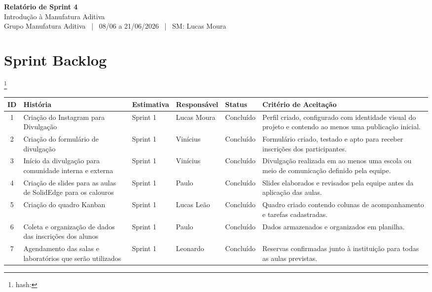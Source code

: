 \documentclass[12pt,a4paper]{article}
\newcommand{\projetotitulo}{Introdução à Manufatura Aditiva}
\newcommand{\grupoid}{Grupo Manufatura Aditiva}
\newcommand{\sprintnum}{4}
\newcommand{\sprintperiodo}{08/06 a 21/06/2026}
\newcommand{\scrummaster}{Lucas Moura}
\newcommand{\gitcommit}{} %
\begin{document}
\begin{center}
{\Large\bfseries Relatório de Sprint \sprintnum}\\
{\large \projetotitulo}\\
\grupoid{} \ | \ \sprintperiodo{} \ | \ SM: \scrummaster
\end{center}

\section{Sprint Backlog}
\footnote{hash: \gitcommit}

\begin{longtable}{|c|p{3.8cm}|p{1.9cm}|p{2.2cm}|p{1.7cm}|p{4.2cm}|}
\toprule
ID & História & Estimativa & Responsável & Status & Critério de Aceitação \\
\midrule
1 & Criação do Instagram para Divulgação & Sprint 1 & Lucas Moura & Concluído & Perfil criado, configurado com identidade visual do projeto e contendo ao menos uma publicação inicial. \\ \hline

2 & Criação do formulário de divulgação & Sprint 1 & Vinícius & Concluído & Formulário criado, testado e apto para receber inscrições dos participantes. \\ \hline

3 & Início da divulgação para comunidade interna e externa & Sprint 1 & Vinícius & Concluído & Divulgação realizada em ao menos uma escola ou meio de comunicação definido pela equipe. \\ \hline

4 & Criação de slides para as aulas de SolidEdge para os calouros & Sprint 1 & Paulo & Concluído & Slides elaborados e revisados pela equipe antes da aplicação das aulas. \\ \hline

5 & Criação do quadro Kanban & Sprint 1 & Lucas Leão & Concluído & Quadro criado contendo colunas de acompanhamento e tarefas cadastradas. \\ \hline

6 & Coleta e organização de dados das inscrições dos alunos & Sprint 1 & Paulo & Concluído & Dados armazenados e organizados em planilha. \\ \hline

7 & Agendamento das salas e laboratórios que serão utilizados & Sprint 1 & Leonardo & Concluído & Reservas confirmadas junto à instituição para todas as aulas previstas. \\ \hline


\end{longtable}
\end{document}
